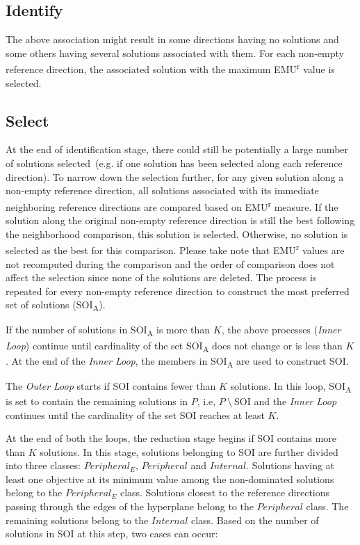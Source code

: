 \subsection{Identify} The above association might result in some directions having no solutions and some others having several solutions associated with them. For each non-empty reference direction, the associated solution with the maximum EMU\textsuperscript{r} value is selected. 

\subsection{Select} At the end of identification stage, there could still be potentially a large number of solutions selected~(e.g. if one solution has been selected along each reference direction). To narrow down the selection further, for any given solution along a non-empty reference direction, all solutions associated with its immediate neighboring reference directions are compared based on EMU\textsuperscript{r} measure. If the solution along the original non-empty reference direction is still the best following the neighborhood comparison, this solution is selected. Otherwise, no solution is selected as the best for this comparison. Please take note that EMU\textsuperscript{r} values are not recomputed during the comparison and the order of comparison does not affect the selection since none of the solutions are deleted. The process is repeated for every non-empty reference direction to construct the most preferred set of solutions (SOI\textsubscript{A}). 


If the number of solutions in SOI\textsubscript{A} is more than $K$, the above processes (\textit{Inner Loop}) continue until cardinality of the set SOI\textsubscript{A} does not change or is less than $K$. At the end of the \textit{Inner Loop}, the members in SOI\textsubscript{A} are used to construct SOI. 

The \textit{Outer Loop} starts if SOI contains fewer than $K$ solutions. In this loop, SOI\textsubscript{A} is set to contain the remaining solutions in $P$, i.e, $P~\setminus~$SOI and the \textit{Inner Loop} continues until the cardinality of the set SOI reaches at least $K$.

At the end of both the loops, the reduction stage begins if SOI contains more than $K$ solutions. In this stage, solutions belonging to SOI are further divided into three classes: $Peripheral_E$, $Peripheral$  and $Internal$. Solutions having at least one objective at its minimum value among the non-dominated solutions belong to the $Peripheral_E$ class. Solutions closest to the reference directions passing through the edges of the hyperplane belong to the $Peripheral$ class. The remaining solutions belong to the $Internal$ class. Based on the number of solutions in SOI at this step, two cases can occur:  

